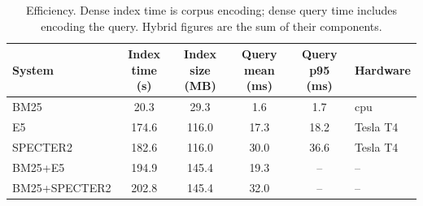 \begin{table}[t]
\centering
\small
\caption{Efficiency. Dense index time is corpus encoding; dense query time includes encoding the query. Hybrid figures are the sum of their components.}
\label{tab:eff}
\begin{tabular}{lccccl}
\toprule
System & Index time (s) & Index size (MB) & Query mean (ms) & Query p95 (ms) & Hardware \\
\midrule
BM25 & 20.3 & 29.3 & 1.6 & 1.7 & cpu \\
E5 & 174.6 & 116.0 & 17.3 & 18.2 & Tesla T4 \\
SPECTER2 & 182.6 & 116.0 & 30.0 & 36.6 & Tesla T4 \\
BM25+E5 & 194.9 & 145.4 & 19.3 & -- & -- \\
BM25+SPECTER2 & 202.8 & 145.4 & 32.0 & -- & -- \\
\bottomrule
\end{tabular}
\end{table}
